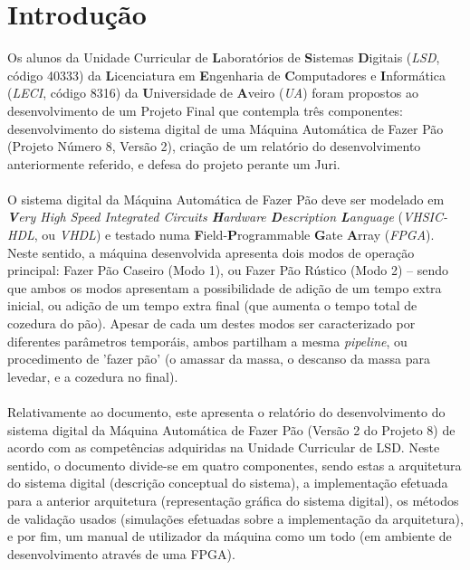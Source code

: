 \documentclass{report}
\begin{document}
\tableofcontents
\listoffigures    %


\clearpage
{}

\chapter{Introdução}
\label{chap.introducao}
Os alunos da Unidade Curricular de \textbf{L}aboratórios de \textbf{S}istemas \textbf{D}igitais (\textit{LSD}, código 40333) da \textbf{L}icenciatura em \textbf{E}ngenharia de \textbf{C}omputadores e \textbf{I}nformática (\textit{LECI}, código 8316) da \textbf{U}niversidade de \textbf{A}veiro (\textit{UA}) foram propostos ao desenvolvimento de um Projeto Final que contempla três componentes: desenvolvimento do sistema digital de uma Máquina Automática de Fazer Pão (Projeto Número 8, Versão 2), criação de um relatório do desenvolvimento anteriormente referido, e defesa do projeto perante um Juri.
\\\\
O sistema digital da Máquina Automática de Fazer Pão deve ser modelado em \textit{\textbf{V}ery High Speed Integrated Circuits \textbf{H}ardware \textbf{D}escription \textbf{L}anguage} (\textit{VHSIC-HDL}, ou \textit{VHDL}) e testado numa \textbf{F}ield-\textbf{P}rogrammable \textbf{G}ate \textbf{A}rray (\textit{FPGA}). Neste sentido, a máquina desenvolvida apresenta dois modos de operação principal: Fazer Pão Caseiro (Modo 1), ou Fazer Pão Rústico (Modo 2) -- sendo que ambos os modos apresentam a possibilidade de adição de um tempo extra inicial, ou adição de um tempo extra final (que aumenta o tempo total de cozedura do pão). Apesar de cada um destes modos ser caracterizado por diferentes parâmetros temporáis, ambos partilham a mesma \textit{pipeline}, ou procedimento de 'fazer pão'  (o amassar da massa, o descanso da massa para levedar, e a cozedura no final).
\\\\
Relativamente ao documento, este apresenta o relatório do desenvolvimento do sistema digital da Máquina Automática de Fazer Pão (Versão 2 do Projeto 8) de acordo com as competências adquiridas na Unidade Curricular de LSD.
Neste sentido, o documento divide-se em quatro componentes, sendo estas a arquitetura do sistema digital (descrição conceptual do sistema), a implementação efetuada para a anterior arquitetura (representação gráfica do sistema digital), os métodos de validação usados (simulações efetuadas sobre a implementação da arquitetura), e por fim, um manual de utilizador da máquina como um todo (em ambiente de desenvolvimento através de uma FPGA).
\end{document}
